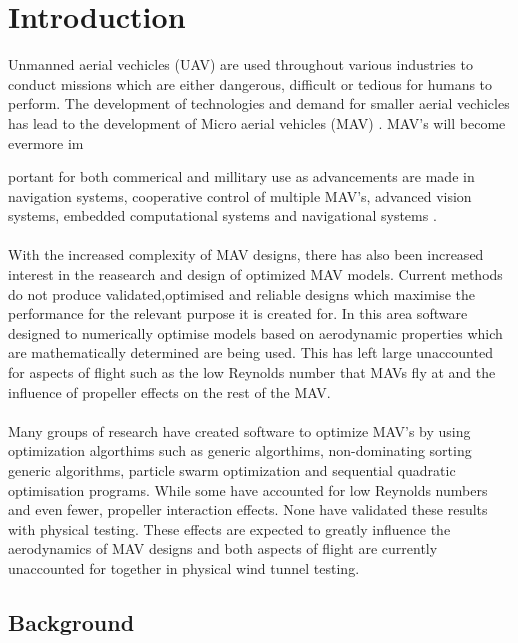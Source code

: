\graphicspath{{./Figs/}}

\chapter{Introduction} 


Unmanned aerial vechicles (UAV) are used throughout various industries to conduct missions which are either dangerous, difficult or tedious for humans to perform. The development of technologies and demand for smaller aerial vechicles has lead to the development of Micro aerial vehicles (MAV) \cite{NONAMI2007}. MAV's will become evermore im{portant for both commerical \cite{} \cite{Liu2014} and millitary use as advancements are made in navigation systems, cooperative control of multiple MAV's, advanced vision systems, embedded computational systems and navigational systems .\\
\\
With the increased complexity of MAV designs, there has also been increased interest in the reasearch and design of optimized MAV models. Current methods  do not produce validated,optimised and reliable designs which maximise the performance for the relevant purpose it is created for. In this area software designed to numerically optimise models based on aerodynamic properties which are mathematically determined are being used. This has left large unaccounted for aspects of flight such as the low Reynolds number that MAVs fly at and the influence of propeller effects on the rest of the MAV.\\
\\
Many groups of research have  created software to optimize MAV's by using optimization algorthims such as generic algorthims, non-dominating sorting generic algorithms, particle swarm optimization and sequential quadratic optimisation programs. While some have accounted for low Reynolds numbers and even fewer, propeller interaction effects. None have validated these results with physical testing. These effects are expected to greatly influence the aerodynamics of MAV designs and both aspects of flight are currently unaccounted for together in physical wind tunnel testing.

\section{Background}

}
